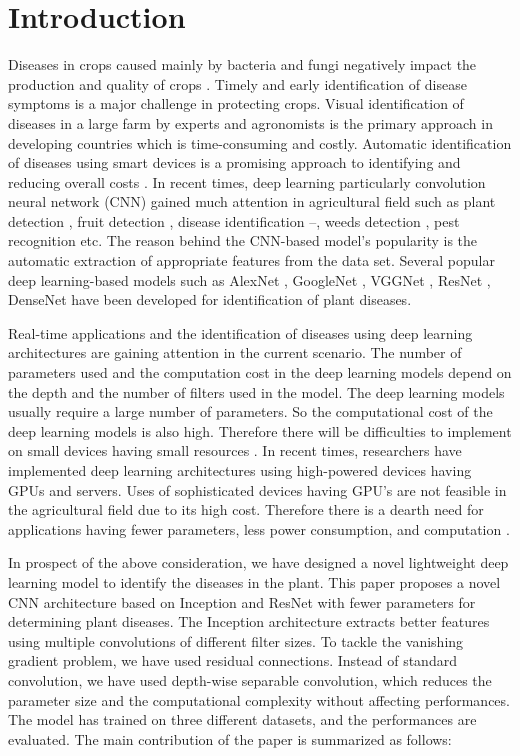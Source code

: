 \section{Introduction} \label{s1-en}
Diseases in crops caused mainly by bacteria and fungi negatively impact the production and quality of crops . Timely and early identification of disease symptoms is a major challenge in protecting crops. Visual identification of diseases in a large farm by experts and agronomists is the primary approach in developing countries which is time-consuming and costly. Automatic identification of diseases using smart devices is a promising approach to identifying and reducing overall costs . In recent times, deep learning particularly convolution neural network (CNN) gained much attention in agricultural field such as plant detection , fruit detection , disease identification –, weeds detection , pest recognition  etc. The reason behind the CNN-based model’s popularity is the automatic extraction of appropriate features from the data set. Several popular deep learning-based models such as AlexNet , GoogleNet , VGGNet , ResNet , DenseNet  have been developed for identification of plant diseases.

Real-time applications and the identification of diseases using deep learning architectures are gaining attention in the current scenario. The number of parameters used and the computation cost in the deep learning models depend on the depth and the number of filters used in the model. The deep learning models usually require a large number of parameters. So the computational cost of the deep learning models is also high. Therefore there will be difficulties to implement on small devices having small resources . In recent times, researchers have implemented deep learning architectures using high-powered devices having GPUs and servers. Uses of sophisticated devices having GPU’s are not feasible in the agricultural field due to its high cost. Therefore there is a dearth need for applications having fewer parameters, less power consumption, and computation .

In prospect of the above consideration, we have designed a novel lightweight deep learning model to identify the diseases in the plant. This paper proposes a novel CNN architecture based on Inception and ResNet with fewer parameters for determining plant diseases. The Inception architecture extracts better features using multiple convolutions of different filter sizes. To tackle the vanishing gradient problem, we have used residual connections. Instead of standard convolution, we have used depth-wise separable convolution, which reduces the parameter size and the computational complexity without affecting performances. The model has trained on three different datasets, and the performances are evaluated. The main contribution of the paper is summarized as follows:

